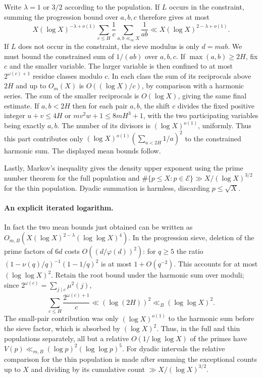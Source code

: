 \documentclass[a4paper,11pt]{article}
\begin{document}
Write $\lambda=1$ or $3/2$ according to the population. If $L$
occurs in the constraint, summing the progression bound over $a,b,c$
therefore gives at most
\[
 X(\log X)^{-\lambda+o(1)}
       \sum_{c\le H}\frac1c
       \sum_{a,b\ll_m X}\frac1{ab}
 \ll X(\log X)^{2-\lambda+o(1)}.
\]
If $L$ does not occur in the constraint, the sieve modulus is
only $d=mab$. We must bound the constrained sum of $1/(ab)$ over
$a,b,c$. If $\max(a,b)\ge2H$, fix $c$ and the smaller variable.
The larger variable is then confined to at most
$2^{\omega(c)+1}$ residue classes modulo $c$. In each class the
sum of its reciprocals above $2H$ and up to $O_m(X)$ is
$O((\log X)/c)$, by comparison with a harmonic series. The sum of
the smaller reciprocals is $O(\log X)$, giving the same final estimate.
If $a,b<2H$ then for each pair $a,b$, the shift $c$ divides the
fixed positive integer $u+v\le4H$ or $mv^2w+1\le 8mH^3+1$,
with the two participating variables being exactly $a,b$. The number
of its divisors is $(\log X)^{o(1)}$, uniformly. Thus this part
contributes only $(\log X)^{o(1)}(\sum_{a<2H}1/a)^2$ to the
constrained harmonic sum. The displayed mean bounds follow.

Lastly, Markov's inequality gives the density upper exponent using
the prime number theorem for the full population and
$\#\{p\le X:p\in\mathcal E\}\gg X/(\log X)^{3/2}$ for the thin
population. Dyadic summation is harmless, discarding $p\le\sqrt X$.

\paragraph{An explicit iterated logarithm.}
In fact the two mean bounds just obtained can be written as
$O_{m,B}(X(\log X)^{2-\lambda}(\log\log X)^4)$.
In the progression sieve, deletion of the prime factors of $6d$
costs $O((d/\varphi(d))^2)$: for $q\ge5$ the ratio
$(1-\nu(q)/q)^{-1}(1-1/q)^2$ is at most $1+O(q^{-2})$.
This accounts for at most $(\log\log X)^2$. Retain the root bound
under the harmonic sum over moduli; since
$2^{\omega(c)}=\sum_{j\mid c}\mu^2(j)$,
\[
 \sum_{c\le H}\frac{2^{\omega(c)+1}}c
 \ll (\log(2H))^2\ll_B(\log\log X)^2 .
\]
The small-pair contribution was only $(\log X)^{o(1)}$ to the
harmonic sum before the sieve factor, which is absorbed by
$(\log X)^2$. Thus, in the full and thin populations separately,
all but a relative $O(1/\log\log X)$ of the primes have
$V(p)\ll_{m,B}(\log p)^2(\log\log p)^5$. For dyadic intervals
the relative comparison for the thin population is made after summing
the exceptional counts up to $X$ and dividing by its cumulative
count $\gg X/(\log X)^{3/2}$.
\end{document}
